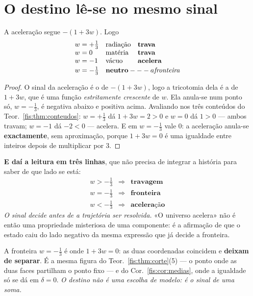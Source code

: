 \documentclass[livro.tex]{subfiles}
\begin{document}
\section{O destino lê-se no mesmo sinal}\label{fis:destino}

\begin{corolario}\label{fis:cor:destino}
A aceleração segue $-(1+3w)$. Logo
\[
\begin{array}{lll}
w=+\tfrac13 & \text{radiação} & \textbf{trava}\\
w=0 & \text{matéria} & \textbf{trava}\\
w=-1 & \text{vácuo} & \textbf{acelera}\\[2pt]
w=-\tfrac13 & \multicolumn{2}{l}{\textbf{neutro} --- a \emph{fronteira}}
\end{array}
\]
\end{corolario}

\begin{proof}
O sinal da aceleração é o de $-(1+3w)$, logo a tricotomia dela é a de $1+3w$, que
é uma função \emph{estritamente crescente} de $w$. Ela anula-se num ponto só,
$w=-\tfrac13$, é negativa abaixo e positiva acima. Avaliando nos três conteúdos
do Teor.~\ref{fis:thm:conteudos}: $w=+\tfrac13$ dá $1+3w=2>0$ e $w=0$ dá $1>0$
--- ambos travam; $w=-1$ dá $-2<0$ --- acelera. E em $w=-\tfrac13$ vale $0$: a
aceleração anula-se \textbf{exactamente}, sem aproximação, porque $1+3w=0$ é uma
igualdade entre inteiros depois de multiplicar por $3$.
\end{proof}

\medskip\noindent\textbf{E daí a leitura em três linhas}, que não precisa de
integrar a história para saber de que lado se está:
\[
\begin{array}{ccl}
w>-\tfrac13 &\Longrightarrow& \textbf{travagem}\\[2pt]
w=-\tfrac13 &\Longrightarrow& \textbf{fronteira}\\[2pt]
w<-\tfrac13 &\Longrightarrow& \textbf{aceleração}
\end{array}
\]
\emph{O sinal decide antes de a trajetória ser resolvida.} «O universo acelera»
não é então uma propriedade misteriosa de uma componente: é a afirmação de que o
estado caiu do lado negativo da mesma expressão que já decide a fronteira.

\medskip\noindent A fronteira $w=-\tfrac13$ é onde $1+3w=0$: as duas coordenadas
coincidem e \textbf{deixam de separar}. É a mesma figura do
Teor.~\ref{fis:thm:corte}(5) --- o ponto onde as duas faces partilham o ponto
fixo --- e do Cor.~\ref{fis:cor:medias}, onde a igualdade só se dá em
$\delta=0$. \emph{O destino não é uma escolha de modelo: é o sinal de uma soma.}
\end{document}
